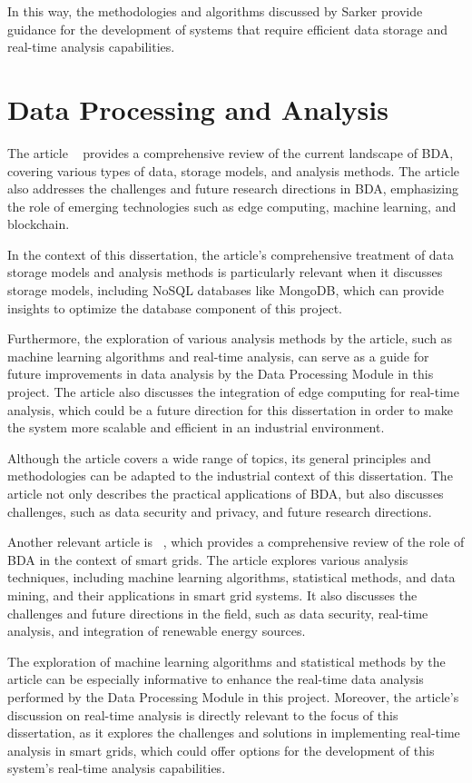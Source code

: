 In this way, the methodologies and algorithms discussed by Sarker \cite{sarker2021machine} provide guidance for the development of systems that require efficient data storage and real-time analysis capabilities.

\section{Data Processing and Analysis}
The article ~\cite{Lv2017} provides a comprehensive review of the current landscape of \gls{BDA}, covering various types of data, storage models, and analysis methods. The article also addresses the challenges and future research directions in \gls{BDA}, emphasizing the role of emerging technologies such as edge computing, machine learning, and blockchain.

In the context of this dissertation, the article's comprehensive treatment of data storage models and analysis methods is particularly relevant when it discusses storage models, including NoSQL databases like MongoDB, which can provide insights to optimize the database component of this project.

Furthermore, the exploration of various analysis methods by the article, such as machine learning algorithms and real-time analysis, can serve as a guide for future improvements in data analysis by the Data Processing Module in this project. The article also discusses the integration of edge computing for real-time analysis, which could be a future direction for this dissertation in order to make the system more scalable and efficient in an industrial environment.

Although the article covers a wide range of topics, its general principles and methodologies can be adapted to the industrial context of this dissertation. The article not only describes the practical applications of \gls{BDA}, but also discusses challenges, such as data security and privacy, and future research directions.

Another relevant article is ~\cite{Zhang2018}, which provides a comprehensive review of the role of \gls{BDA} in the context of smart grids. The article explores various analysis techniques, including machine learning algorithms, statistical methods, and data mining, and their applications in smart grid systems. It also discusses the challenges and future directions in the field, such as data security, real-time analysis, and integration of renewable energy sources.

The exploration of machine learning algorithms and statistical methods by the article can be especially informative to enhance the real-time data analysis performed by the Data Processing Module in this project. Moreover, the article's discussion on real-time analysis is directly relevant to the focus of this dissertation, as it explores the challenges and solutions in implementing real-time analysis in smart grids, which could offer options for the development of this system's real-time analysis capabilities.

